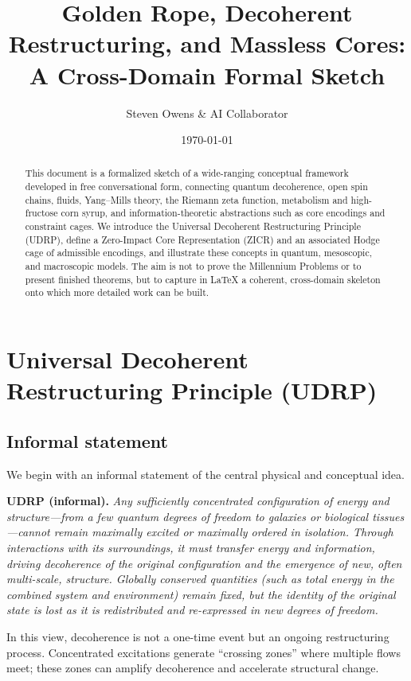 \documentclass[11pt]{article}
\title{Golden Rope, Decoherent Restructuring, and Massless Cores:\\
A Cross-Domain Formal Sketch}
\author{Steven Owens \& AI Collaborator}
\date{\today}
\theoremstyle{definition}
\begin{document}
\maketitle

\begin{abstract}
This document is a formalized sketch of a wide-ranging conceptual framework developed in free conversational form, connecting quantum decoherence, open spin chains, fluids, Yang--Mills theory, the Riemann zeta function, metabolism and high-fructose corn syrup, and information-theoretic abstractions such as core encodings and constraint cages. We introduce the Universal Decoherent Restructuring Principle (UDRP), define a Zero-Impact Core Representation (ZICR) and an associated Hodge cage of admissible encodings, and illustrate these concepts in quantum, mesoscopic, and macroscopic models. The aim is not to prove the Millennium Problems or to present finished theorems, but to capture in LaTeX a coherent, cross-domain skeleton onto which more detailed work can be built.
\end{abstract}

\tableofcontents

\section{Universal Decoherent Restructuring Principle (UDRP)}

\subsection{Informal statement}

We begin with an informal statement of the central physical and conceptual idea.

\medskip

\noindent\textbf{UDRP (informal).}
\emph{
Any sufficiently concentrated configuration of energy and structure---from a few quantum degrees of freedom to galaxies or biological tissues---cannot remain maximally excited or maximally ordered in isolation. Through interactions with its surroundings, it must transfer energy and information, driving decoherence of the original configuration and the emergence of new, often multi-scale, structure. Globally conserved quantities (such as total energy in the combined system and environment) remain fixed, but the identity of the original state is lost as it is redistributed and re-expressed in new degrees of freedom.
}

In this view, decoherence is not a one-time event but an ongoing restructuring process. Concentrated excitations generate ``crossing zones'' where multiple flows meet; these zones can amplify decoherence and accelerate structural change.
\end{document}
